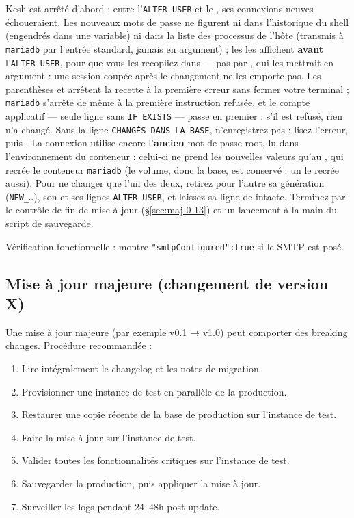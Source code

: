 \documentclass[a4paper,11pt,oneside]{article}
\begin{document}
\begin{sloppypar}
Kesh est arrêté d'abord : entre l'\texttt{ALTER USER} et le , ses connexions neuves échoueraient. Les nouveaux mots de passe ne figurent ni dans l'historique du shell (engendrés dans une variable) ni dans la liste des processus de l'hôte (transmis à \texttt{mariadb} par l'entrée standard, jamais en argument) ; les  les affichent \textbf{avant} l'\texttt{ALTER USER}, pour que vous les recopiiez dans  --- pas par , qui les mettrait en argument : une session coupée après le changement ne les emporte pas. Les parenthèses et  arrêtent la recette à la première erreur sans fermer votre terminal ; \texttt{mariadb} s'arrête de même à la première instruction refusée, et le compte applicatif --- seule ligne sans \texttt{IF EXISTS} --- passe en premier : s'il est refusé, rien n'a changé. Sans la ligne \texttt{CHANGÉS DANS LA BASE}, n'enregistrez pas  ; lisez l'erreur, puis . La connexion utilise encore l'\textbf{ancien} mot de passe root, lu dans l'environnement du conteneur : celui-ci ne prend les nouvelles valeurs qu'au , qui recrée le conteneur \texttt{mariadb} (le volume, donc la base, est conservé ; un  le recrée aussi). Pour ne changer que l'un des deux, retirez pour l'autre sa génération (\texttt{NEW\_…}), son  et ses lignes \texttt{ALTER USER}, et laissez sa ligne de  intacte. Terminez par le contrôle de fin de mise à jour (\S\ref{sec:maj-0-13}) et un lancement à la main du script de sauvegarde.
\end{sloppypar}


Vérification fonctionnelle :  montre \texttt{"smtpConfigured":true} si le SMTP est posé.

\subsection{Mise à jour majeure (changement de version X)}

Une mise à jour majeure (par exemple v0.1 → v1.0) peut comporter des breaking changes. Procédure recommandée :

\begin{enumerate}
    \item Lire intégralement le changelog et les notes de migration.
    \item Provisionner une instance de test en parallèle de la production.
    \item Restaurer une copie récente de la base de production sur l'instance de test.
    \item Faire la mise à jour sur l'instance de test.
    \item Valider toutes les fonctionnalités critiques sur l'instance de test.
    \item Sauvegarder la production, puis appliquer la mise à jour.
    \item Surveiller les logs pendant 24--48h post-update.
\end{enumerate}
\end{document}
